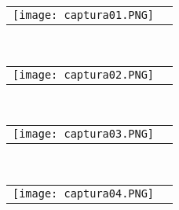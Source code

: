 \documentclass[10pt]{article}\usepackage[]{graphicx}\usepackage[]{color}
\begin{document}
\begin{tabular}{p{} p{} }
\texttt{[image: captura01.PNG]}
\end{tabular}\\
\begin{tabular}{p{} p{} }
\texttt{[image: captura02.PNG]}
\end{tabular}\\
\begin{tabular}{p{} p{} }
\texttt{[image: captura03.PNG]}
\end{tabular}\\
\begin{tabular}{p{} p{} }
\texttt{[image: captura04.PNG]}
\end{tabular}\\
\end{document}
